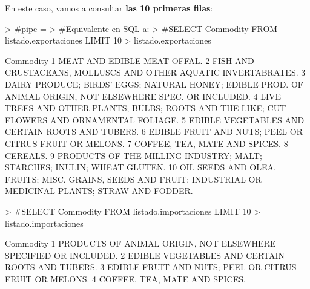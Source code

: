 \documentclass [a4paper] {article}
\begin{document}
En este caso, vamos a consultar \textbf{las 10 primeras filas}:
{\footnotesize
\begin{Schunk}
\begin{Sinput}
> #pipe = %>%, muy importante para concatenar varias acciones sobre un dataframe
> #Equivalente en SQL a:
> #SELECT Commodity FROM listado.exportaciones LIMIT 10
> listado.exportaciones %>% select(Commodity) %>% head(10)
\end{Sinput}
\begin{Soutput}
                                                                                                      Commodity
1                                                                                   MEAT AND EDIBLE MEAT OFFAL.
2                                               FISH AND CRUSTACEANS, MOLLUSCS AND OTHER AQUATIC INVERTABRATES.
3    DAIRY PRODUCE; BIRDS' EGGS; NATURAL HONEY; EDIBLE PROD. OF ANIMAL ORIGIN, NOT ELSEWHERE SPEC. OR INCLUDED.
4                   LIVE TREES AND OTHER PLANTS; BULBS; ROOTS AND THE LIKE; CUT FLOWERS AND ORNAMENTAL FOLIAGE.
5                                                               EDIBLE VEGETABLES AND CERTAIN ROOTS AND TUBERS.
6                                                        EDIBLE FRUIT AND NUTS; PEEL OR CITRUS FRUIT OR MELONS.
7                                                                                 COFFEE, TEA, MATE AND SPICES.
8                                                                                                      CEREALS.
9                                       PRODUCTS OF THE MILLING INDUSTRY; MALT; STARCHES; INULIN; WHEAT GLUTEN.
10 OIL SEEDS AND OLEA. FRUITS; MISC. GRAINS, SEEDS AND FRUIT; INDUSTRIAL OR MEDICINAL PLANTS; STRAW AND FODDER.
\end{Soutput}
\begin{Sinput}
> #SELECT Commodity FROM listado.importaciones LIMIT 10
> listado.importaciones %>% select(Commodity) %>% head(10)
\end{Sinput}
\begin{Soutput}
                                                                                                      Commodity
1                                               PRODUCTS OF ANIMAL ORIGIN, NOT ELSEWHERE SPECIFIED OR INCLUDED.
2                                                               EDIBLE VEGETABLES AND CERTAIN ROOTS AND TUBERS.
3                                                        EDIBLE FRUIT AND NUTS; PEEL OR CITRUS FRUIT OR MELONS.
4                                                                                 COFFEE, TEA, MATE AND SPICES.

\end{Soutput}
\end{Schunk}}
\end{document}

